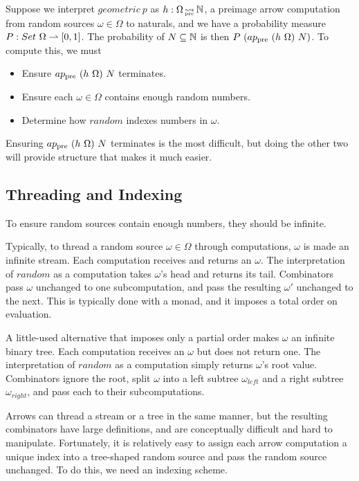 Suppose we interpret $geometric~p$ as $h : \Omega \operatorname{\rightsquigarrow_{\mspace{-22mu}_\mathrm{pre}}} \mathbb{N}$, a preimage arrow computation from random sources $\omega \in \Omega$ to naturals, and we have a probability measure $P : Set~\Omega \rightharpoonup [0,1]$.
The probability of $N \subseteq \mathbb{N}$ is then $P~(ap_\mathrm{pre}~(h~\Omega)~N)$.
To compute this, we must
\begin{itemize}
	\item Ensure $ap_\mathrm{pre}~(h~\Omega)~N$ terminates.
	\item Ensure each $\omega \in \Omega$ contains enough random numbers.
	\item Determine how $random$ indexes numbers in $\omega$.
\end{itemize}
Ensuring $ap_\mathrm{pre}~(h~\Omega)~N$ terminates is the most difficult, but doing the other two will provide structure that makes it much easier.

\subsection{Threading and Indexing}
\label{sec:threading-and-indexing}

To ensure random sources contain enough numbers, they should be infinite.

Typically, to thread a random source $\omega \in \Omega$ through computations, $\omega$ is made an infinite stream.
Each computation receives and returns an $\omega$.
The interpretation of $random$ as a computation takes $\omega$'s head and returns its tail.
Combinators pass $\omega$ unchanged to one subcomputation, and pass the resulting $\omega'$ unchanged to the next.
This is typically done with a monad, and it imposes a total order on evaluation.

A little-used alternative that imposes only a partial order makes $\omega$ an infinite binary tree.
Each computation receives an $\omega$ but does not return one.
The interpretation of $random$ as a computation simply returns $\omega$'s root value.
Combinators ignore the root, split $\omega$ into a left subtree $\omega_{left}$ and a right subtree $\omega_{right}$, and pass each to their subcomputations.

Arrows can thread a stream or a tree in the same manner, but the resulting combinators have large definitions, and are conceptually difficult and hard to manipulate.
Fortunately, it is relatively easy to assign each arrow computation a unique index into a tree-shaped random source and pass the random source unchanged.
To do this, we need an indexing scheme.

